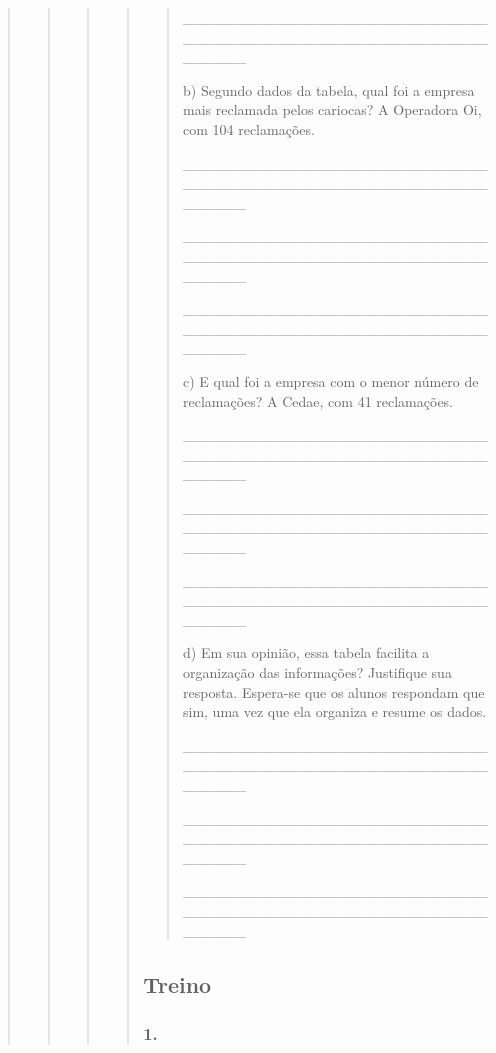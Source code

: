 \begin{quote}
\begin{quote}
\begin{quote}
\begin{quote}
\begin{quote}
\_\_\_\_\_\_\_\_\_\_\_\_\_\_\_\_\_\_\_\_\_\_\_\_\_\_\_\_\_\_\_\_\_\_\_\_\_\_\_\_\_\_\_\_\_\_\_\_\_\_\_\_\_\_\_\_\_\_\_\_\_\_\_\_

b) Segundo dados da tabela, qual foi a empresa mais reclamada pelos
cariocas? A Operadora Oi, com 104 reclamações.

\_\_\_\_\_\_\_\_\_\_\_\_\_\_\_\_\_\_\_\_\_\_\_\_\_\_\_\_\_\_\_\_\_\_\_\_\_\_\_\_\_\_\_\_\_\_\_\_\_\_\_\_\_\_\_\_\_\_\_\_\_\_\_\_

\_\_\_\_\_\_\_\_\_\_\_\_\_\_\_\_\_\_\_\_\_\_\_\_\_\_\_\_\_\_\_\_\_\_\_\_\_\_\_\_\_\_\_\_\_\_\_\_\_\_\_\_\_\_\_\_\_\_\_\_\_\_\_\_

\_\_\_\_\_\_\_\_\_\_\_\_\_\_\_\_\_\_\_\_\_\_\_\_\_\_\_\_\_\_\_\_\_\_\_\_\_\_\_\_\_\_\_\_\_\_\_\_\_\_\_\_\_\_\_\_\_\_\_\_\_\_\_\_

c) E qual foi a empresa com o menor número de reclamações? A Cedae, com
41 reclamações.

\protect\hypertarget{_Hlk128145702}{}{}\_\_\_\_\_\_\_\_\_\_\_\_\_\_\_\_\_\_\_\_\_\_\_\_\_\_\_\_\_\_\_\_\_\_\_\_\_\_\_\_\_\_\_\_\_\_\_\_\_\_\_\_\_\_\_\_\_\_\_\_\_\_\_\_

\_\_\_\_\_\_\_\_\_\_\_\_\_\_\_\_\_\_\_\_\_\_\_\_\_\_\_\_\_\_\_\_\_\_\_\_\_\_\_\_\_\_\_\_\_\_\_\_\_\_\_\_\_\_\_\_\_\_\_\_\_\_\_\_

\_\_\_\_\_\_\_\_\_\_\_\_\_\_\_\_\_\_\_\_\_\_\_\_\_\_\_\_\_\_\_\_\_\_\_\_\_\_\_\_\_\_\_\_\_\_\_\_\_\_\_\_\_\_\_\_\_\_\_\_\_\_\_\_

d) Em sua opinião, essa tabela facilita a organização das informações?
Justifique sua resposta. Espera-se que os alunos respondam que sim, uma
vez que ela organiza e resume os dados.

\_\_\_\_\_\_\_\_\_\_\_\_\_\_\_\_\_\_\_\_\_\_\_\_\_\_\_\_\_\_\_\_\_\_\_\_\_\_\_\_\_\_\_\_\_\_\_\_\_\_\_\_\_\_\_\_\_\_\_\_\_\_\_\_

\_\_\_\_\_\_\_\_\_\_\_\_\_\_\_\_\_\_\_\_\_\_\_\_\_\_\_\_\_\_\_\_\_\_\_\_\_\_\_\_\_\_\_\_\_\_\_\_\_\_\_\_\_\_\_\_\_\_\_\_\_\_\_\_

\_\_\_\_\_\_\_\_\_\_\_\_\_\_\_\_\_\_\_\_\_\_\_\_\_\_\_\_\_\_\_\_\_\_\_\_\_\_\_\_\_\_\_\_\_\_\_\_\_\_\_\_\_\_\_\_\_\_\_\_\_\_\_\_
\end{quote}

\subsection{Treino}\label{treino-8}

\subsubsection{1.}\label{section-68}


\end{quote}
\end{quote}
\end{quote}
\end{quote}
